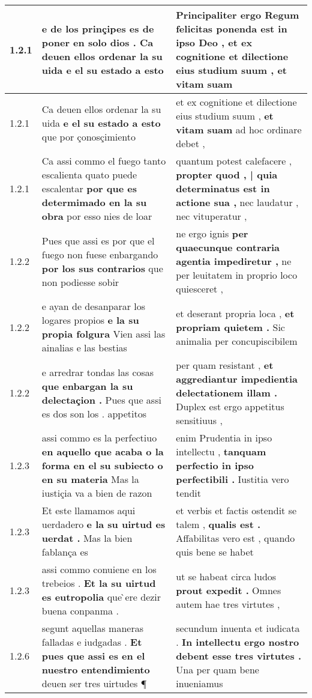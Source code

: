 \begin{tabular}{|p{1cm}|p{6.5cm}|p{6.5cm}|}
1.2.1 & e de los prinçipes es de poner en solo dios . \textbf{ Ca deuen ellos ordenar la su uida } e el su estado a esto & Principaliter ergo Regum felicitas ponenda est in ipso Deo , \textbf{ et ex cognitione et dilectione eius studium suum , } et vitam suam \\\hline
1.2.1 & Ca deuen ellos ordenar la su uida \textbf{ e el su estado a esto } que por çonosçimiento & et ex cognitione et dilectione eius studium suum , \textbf{ et vitam suam } ad hoc ordinare debet , \\\hline
1.2.1 & Ca assi commo el fuego tanto escalienta quato puede escalentar \textbf{ por que es determimado en la su obra } por esso nies de loar & quantum potest calefacere , \textbf{ propter quod , | quia determinatus est in actione sua , } nec laudatur , nec vituperatur , \\\hline
1.2.2 & Pues que assi es por que el fuego non fuese enbargando \textbf{ por los sus contrarios } que non podiesse sobir & ne ergo ignis \textbf{ per quaecunque contraria agentia impediretur , } ne per leuitatem in proprio loco quiesceret , \\\hline
1.2.2 & e ayan de desanparar los logares propios \textbf{ e la su propia folgura } Vien assi las ainalias e las bestias & et deserant propria loca , \textbf{ et propriam quietem . } Sic animalia per concupiscibilem \\\hline
1.2.2 & e arredrar tondas las cosas \textbf{ que enbargan la su delectaçion . } Pues que assi es dos son los . appetitos & per quam resistant , \textbf{ et aggrediantur impedientia delectationem illam . } Duplex est ergo appetitus sensitiuus , \\\hline
1.2.3 & assi commo es la perfectiuo \textbf{ en aquello que acaba o la forma en el su subiecto o en su materia } Mas la iustiçia va a bien de razon & enim Prudentia in ipso intellectu , \textbf{ tanquam perfectio in ipso perfectibili . } Iustitia vero tendit \\\hline
1.2.3 & Et este llamamos aqui uerdadero \textbf{ e la su uirtud es uerdat . } Mas la bien fablança es & et verbis et factis ostendit se talem , \textbf{ qualis est . } Affabilitas vero est , quando quis bene se habet \\\hline
1.2.3 & assi commo conuiene en los trebeios . \textbf{ Et la su uirtud es eutropolia } que ̀ere dezir buena conpanma . & ut se habeat circa ludos \textbf{ prout expedit . } Omnes autem hae tres virtutes , \\\hline
1.2.6 & segunt aquellas maneras falladas e iudgadas . \textbf{ Et pues que assi es en el nuestro entendimiento } deuen ser tres uirtudes ¶ & secundum inuenta et iudicata . \textbf{ In intellectu ergo nostro debent esse tres virtutes . } Una per quam bene inueniamus \\\hline

\end{tabular}
